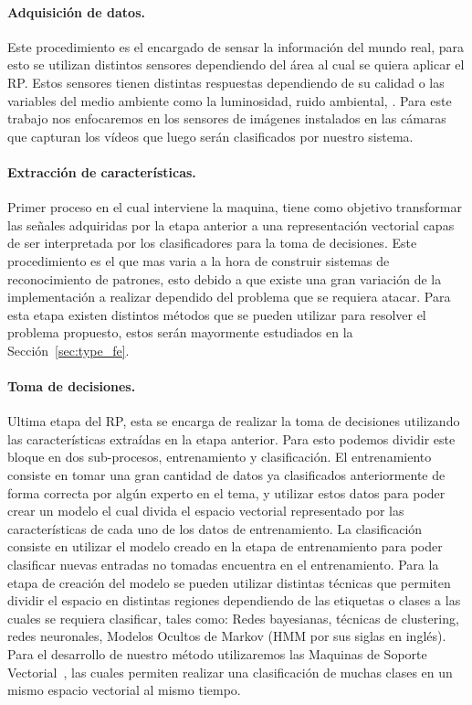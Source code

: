 	\paragraph{Adquisición de datos.} Este procedimiento es el encargado de sensar la información del mundo real, para esto se utilizan distintos sensores dependiendo del área al cual se quiera aplicar el RP. Estos sensores tienen distintas respuestas dependiendo de su calidad o las variables del medio ambiente como la luminosidad, ruido ambiental, \etc. Para este trabajo nos enfocaremos en los sensores de imágenes instalados en las cámaras que capturan los vídeos que luego serán clasificados por nuestro sistema.
	
	\paragraph{Extracción de características.} Primer proceso en el cual interviene la maquina, tiene como objetivo transformar las señales adquiridas por la etapa anterior a una representación vectorial capas de ser interpretada por los clasificadores para la toma de decisiones. Este procedimiento es el que mas varia a la hora de construir sistemas de reconocimiento de patrones, esto debido a que existe una gran variación de la implementación a realizar dependido del problema que se requiera atacar. Para esta etapa existen distintos métodos que se pueden utilizar para resolver el problema propuesto, estos serán mayormente estudiados en la Sección~\ref{sec:type_fe}.
	
	\paragraph{Toma de decisiones.} Ultima etapa del RP, esta se encarga de realizar la toma de decisiones utilizando las características extraídas en la etapa anterior. Para esto podemos dividir este bloque en dos sub-procesos, entrenamiento y clasificación. El entrenamiento consiste en tomar una gran cantidad de datos ya clasificados anteriormente de forma correcta por algún experto en el tema, y utilizar estos datos para poder crear un modelo el cual divida el espacio vectorial representado por las características de cada uno de los datos de entrenamiento. La clasificación consiste en utilizar el modelo creado en la etapa de entrenamiento para poder clasificar nuevas entradas no tomadas encuentra en el entrenamiento. Para la etapa de creación del modelo se pueden utilizar distintas técnicas que permiten dividir el espacio en distintas regiones dependiendo de las etiquetas o clases a las cuales se requiera clasificar, tales como: Redes bayesianas, técnicas de clustering, redes neuronales, Modelos Ocultos de Markov (HMM por sus siglas en inglés). Para el desarrollo de nuestro método utilizaremos las Maquinas de Soporte Vectorial~\cite{Cortes1995,Hearst1998}, las cuales permiten realizar una clasificación de muchas clases en un mismo espacio vectorial al mismo tiempo. 


